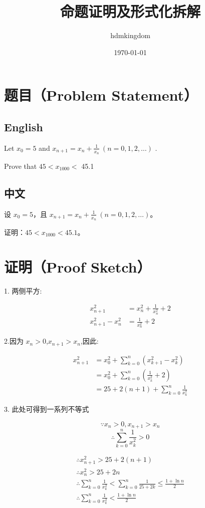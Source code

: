 \documentclass[11pt]{article}
\title{命题证明及形式化拆解}
\author{hdmkingdom}
\date{\today}
\begin{document}
\maketitle

\section*{题目（Problem Statement）}

\subsection*{English}
Let $x_{0}=5$ and $x_{n+1}=x_{n}+\frac{1} {x_{n}} ~ ( n=0, 1, 2, \ldots)$ . 

Prove that $4 5 < x_{1 0 0 0} <$ 45.1

\subsection*{中文}
设 $x_{0}=5$，且 $x_{n+1}=x_{n}+\frac{1}{x_{n}} ~ (n=0, 1, 2, \ldots)$。

证明：$45 < x_{1000} < 45.1$。

\section*{证明（Proof Sketch）}

1. 两侧平方:

\begin{align}
x_{n+1}^2 &= x_n^2 + \frac{1}{x_n^2} + 2\\
x_{n+1}^2 - x_n^2 &= \frac{1}{x_n^2} + 2 \label{eq:formula2}
\end{align}

2.因为 $x_n > 0$,$x_{n+1} > x_n$,因此:

\begin{align}
x_{n+1}^2 & = x_0^2 + \sum_{k=0}^{n}(x_{k+1}^2 - x_k^2)\\
& = x_0^2 + \sum_{k=0}^{n}(\frac{1}{x_k^2} + 2) \\
& = 25 + 2(n+1) + \sum_{k=0}^{n}\frac{1}{x_k^2} \label{eq:formula5} 
\end{align}

3. 此处可得到一系列不等式

\[\because x_n > 0, x_{n+1} > x_n\]
\[\therefore \sum_{k=0}^{n}\frac{1}{x_k^2} > 0\]

\begin{align}
    \therefore x_{n+1}^2 > 25 + 2(n + 1) \\
    \therefore x_{n}^2 > 25 + 2n \\
    \therefore \sum_{k=0}^{n}\frac{1}{x_k^2} < \sum_{k=0}^{n}\frac{1}{25 + 2k} \le \frac{1 + \ln n}{2} \\
    \therefore \sum_{k=0}^{n}\frac{1}{x_k^2} < \frac{1 + \ln n}{2} \\
\end{align}
\end{document}
